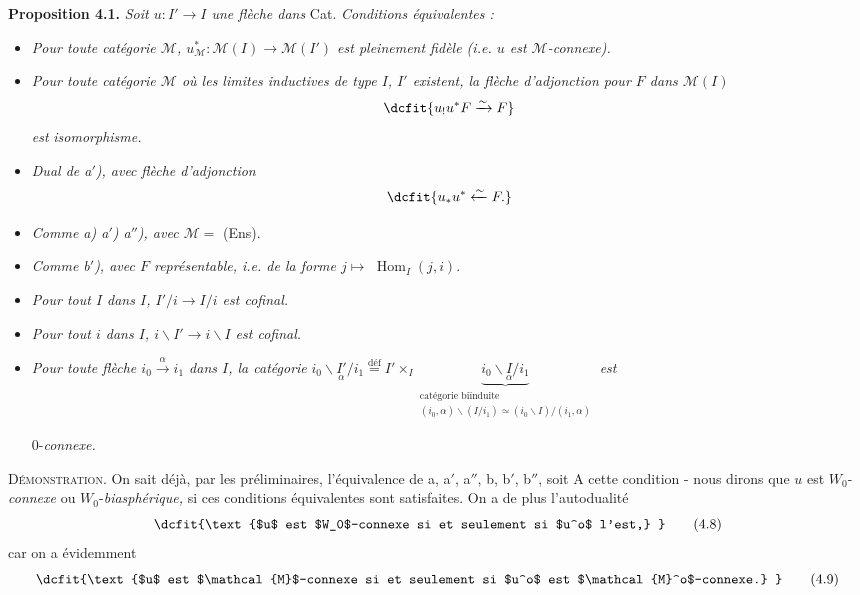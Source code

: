 \documentclass[11pt]{article}
\def\dcprintedpending{}
\newcommand{\msp}[1]{\marginpar{\footnotesize\raggedright
  \ifx\dcprintedpending\empty\else p.~\dcprintedpending\par\fi
  [#1]}\gdef\dcprintedpending{}}
\newcommand{\Hom}{\operatorname{Hom}}
\newcommand{\bs}{\backslash}
\newcommand{\cM}{\mathcal{M}}
\newcommand{\defeq}{\overset{\text{déf}}{=}}
\begin{document}
\noindent\textbf{Proposition 4.1.} \textit{Soit $u : I' \longrightarrow I$ une flèche dans} Cat. \textit{Conditions équivalentes :}
\begin{itemize}[label={}]
\item[\textit{a)}] \textit{Pour toute catégorie $\cM$, $u^*_{\cM} : \cM(I) \longrightarrow \cM(I')$ est pleinement fidèle (i.e. $u$ est $\cM$-connexe).}
\item[\textit{d$'$)}] \textit{Pour toute catégorie $\cM$ où les limites inductives de type $I$, $I'$ existent, la flèche d'adjonction pour $F$ dans $\cM(I)$} %
\[
\dcfit{u_!u^*F \xrightarrow{\sim} F
}
\]
\textit{est} \textit{isomorphisme.}
\item[\textit{a$''$)}] \textit{Dual de a$'$), avec} \textit{flèche d'adjonction}
\[
\dcfit{u_*u^* \xleftarrow{\sim} F. %
}
\]
\item[\textit{b) b$'$) b$''$)}] \textit{Comme a) a$'$) a$''$), avec $\cM =$} (Ens).
\item[\textit{c)}] \textit{Comme b$'$), avec $F$ représentable, i.e. de la forme $j \longmapsto$} $\Hom_I(j, i)$.
\item[\textit{d)}] \textit{Pour tout $I$ dans $I$, $I'/i \longrightarrow I/i$ est cofinal.} %
\item[\textit{d$'$)}] \textit{Pour tout $i$ dans $I$, $i\bs I' \longrightarrow i\bs I$ est cofinal.}
\item[\textit{d$''$)}] \textit{Pour toute flèche $i_0 \xrightarrow{\alpha} i_1$ dans $I$, la catégorie} $i_0\bs \underset{\alpha}{I'}/i_1 \defeq I' \times_I \underbrace{i_0\bs \underset{\alpha}{I}/i_1}_{\substack{\text{catégorie biïnduite}\\ (i_0, \alpha)\bs(I/i_1) \simeq (i_0\bs I)/(i_1, \alpha)}}$ \qquad \textit{est}

0-\textit{connexe.}
\end{itemize}

\msp{page 53}
\textsc{Démonstration.} On sait déjà, par les préliminaires, l'équivalence de a, a$'$, a$''$, b, b$'$, b$''$, soit A cette condition - nous dirons que $u$ est $W_0$-\textit{connexe} ou $W_0$-\textit{biasphérique,} si ces conditions équivalentes sont satisfaites. On a de plus l'autodualité
\[
\dcfit{\text{$u$ est $W_0$-connexe si et seulement si $u^o$ l'est,}
}
\tag*{(4.8)}
\]
car on a évidemment
\[
\dcfit{\text{$u$ est $\cM$-connexe si et seulement si $u^o$ est $\cM^o$-connexe.}
}
\tag*{(4.9)}
\]
\end{document}
